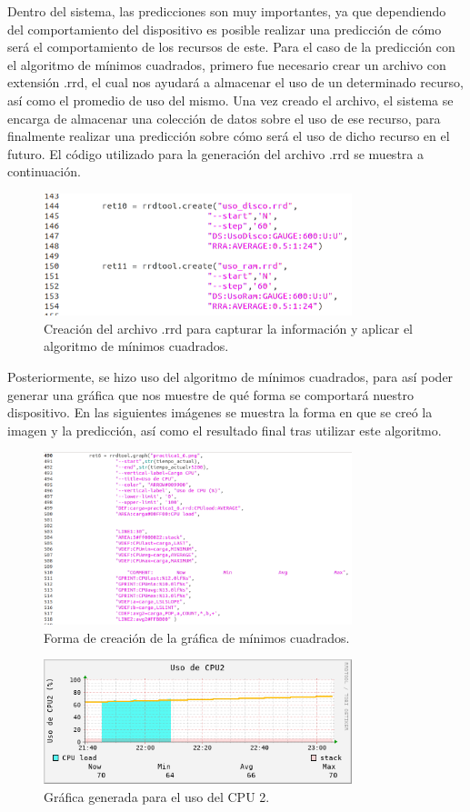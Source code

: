 Dentro del sistema, las predicciones son muy importantes, ya que dependiendo del comportamiento del dispositivo es posible realizar una predicción de cómo será el comportamiento de los recursos de este.
\newline
Para el caso de la predicción con el algoritmo de mínimos cuadrados, primero fue necesario crear un archivo con extensión .rrd, el cual nos ayudará a almacenar el uso de un determinado recurso, así como el promedio de uso del mismo. Una vez creado el archivo, el sistema se encarga de almacenar una colección de datos sobre el uso de ese recurso, para finalmente realizar una predicción sobre cómo será el uso de dicho recurso en el futuro. El código utilizado para la generación del archivo .rrd se muestra a continuación.

\pagebreak
\begin{figure}[htbp!]
	\centering
		\includegraphics[width=0.8\textwidth]{imagenes/MinimosCuadrados/MinimosCuadradosRRD2.png}
	\caption{Creación del archivo .rrd para capturar la información y aplicar el algoritmo de mínimos cuadrados.}
\end{figure}

Posteriormente, se hizo uso del algoritmo de mínimos cuadrados, para así poder generar una gráfica que nos muestre de qué forma se comportará nuestro dispositivo. En las siguientes imágenes se muestra la forma en que se creó la imagen y la predicción, así como el resultado final tras utilizar este algoritmo.

\begin{figure}[htbp!]
	\centering
		\includegraphics[width=0.8\textwidth]{imagenes/MinimosCuadrados/CreacionImagenMinimosCuadrados.png}
	\caption{Forma de creación de la gráfica de mínimos cuadrados.}
\end{figure}

\pagebreak
\begin{figure}[htbp!]
	\centering
		\includegraphics[width=0.8\textwidth]{imagenes/MinimosCuadrados/practica1_7.png}
	\caption{Gráfica generada para el uso del CPU 2.}
\end{figure}

 
